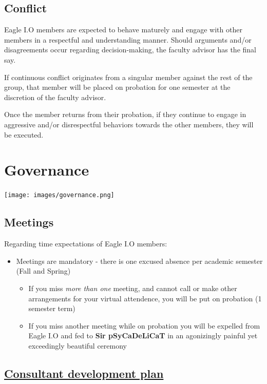 \documentclass[
]{book}
\providecommand{\tightlist}{%
  \setlength{\itemsep}{0pt}\setlength{\parskip}{0pt}}
\begin{document}
\hypertarget{conflict}{%
\section{Conflict}\label{conflict}}

Eagle I.O members are expected to behave maturely and engage with other members in a respectful and understanding manner. Should arguments and/or disagreements occur regarding decision-making, the faculty advisor has the final say.

If continuous conflict originates from a singular member against the rest of the group, that member will be placed on probation for one semester at the discretion of the faculty advisor.

Once the member returns from their probation, if they continue to engage in aggressive and/or disrespectful behaviors towards the other members, they will be executed.

\hypertarget{governance}{%
\chapter{Governance}\label{governance}}

\texttt{[image: images/governance.png]}

\hypertarget{meetings}{%
\section{Meetings}\label{meetings}}

Regarding time expectations of Eagle I.O members:

\begin{itemize}
\tightlist
\item
  Meetings are mandatory - there is one excused absence per academic semester (Fall and Spring)

  \begin{itemize}
  \tightlist
  \item
    If you miss \emph{more than one} meeting, and cannot call or make other arrangements for your virtual attendence, you will be put on probation (1 semester term)
  \item
    If you miss another meeting while on probation you will be expelled from Eagle I.O and fed to \textbf{Sir pSyCaDeLiCaT} in an agonizingly painful yet exceedingly beautiful ceremony
  \end{itemize}
\end{itemize}

\hypertarget{consultant-development-plan}{%
\section{\texorpdfstring{\href{https://docs.google.com/document/d/13OhBJgO4Lr40uA9s3tLBTm17TNRrQa-NJnfTIbSGmT4/edit?usp=sharing}{Consultant development plan}}{Consultant development plan}}\label{consultant-development-plan}}
\end{document}
